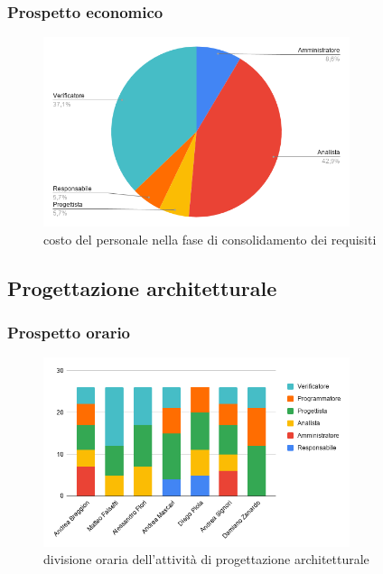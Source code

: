     \subsubsection{Prospetto economico}
    \def\salarycontent{
        {Amministratore,3,20,60},
        {Analista,15,25,375},
        {Progettista,2,22,44},
        {Programmatore,0,15,0},
        {Responsabile,2,30,60},
        {Verificatore,13,15,195},
        {Totale,35,127,734},
    }
    
    \begin{figure}[H]
        \centering
        \includegraphics[width=0.8\textwidth]{source/img/consolidamento_ruoli.png}
        \caption{costo del personale nella fase di consolidamento dei requisiti}
    \end{figure}
\subsection{Progettazione architetturale}
    \subsubsection{Prospetto orario}
    \def\hourlycontent{
        {Andrea Breggion,0,7,4,6,5,4,26},
        {Matteo Falsetti,0,0,5,7,0,14,26},
        {Alessandro Flori,0,0,7,10,0,9,26},
        {Andrea Mascari,4,0,0,11,6,5,26},
        {Diego Piola,5,0,6,9,6,0,26},
        {Andrea Signori,0,6,4,7,5,4,26},
        {Damiano Zanardo,0,0,0,12,9,5,26},
        {Ore totali, 9, 13, 26, 62, 31, 41, 182},
    }
    
    \begin{figure}[H]
        \centering
        \includegraphics[width=0.8\textwidth]{source/img/architettura_orari.png}
        \caption{divisione oraria dell'attività di progettazione architetturale}
    \end{figure}
